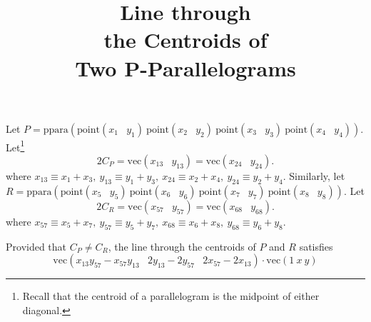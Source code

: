 \documentclass{article}
\title{Line through\\ the Centroids of\\ Two P-Parallelograms}
\begin{document}
\maketitle
\newcommand{\en}{\phantom{N}}
\noindent
Let
$P = \mathrm{ppara}(
\mathrm{point}(x_1\en y_1)\
\mathrm{point}(x_2\en y_2)\
\mathrm{point}(x_3\en y_3)\
\mathrm{point}(x_4\en y_4))$.
Let\footnote{Recall
that the centroid of a parallelogram is the midpoint of either diagonal.}
\[
2C_P =
\mathrm{vec}(x_{13}\en y_{13}) = 
\mathrm{vec}(x_{24}\en y_{24}).
\]
where
$x_{13} \equiv x_1 + x_3,\ y_{13} \equiv y_1 + y_3,\
x_{24} \equiv x_2 + x_4,\ y_{24} \equiv y_2 + y_4$.
Similarly, let
$R = \mathrm{ppara}(
\mathrm{point}(x_5\en y_5)\
\mathrm{point}(x_6\en y_6)\
\mathrm{point}(x_7\en y_7)\
\mathrm{point}(x_8\en y_8))$.
Let
\[
2C_R =
\mathrm{vec}(x_{57}\en y_{57}) =
\mathrm{vec}(x_{68}\en y_{68}).
\]
where
$x_{57} \equiv x_5 + x_7,\ y_{57} \equiv y_5 + y_7,\
x_{68} \equiv x_6 + x_8,\ y_{68} \equiv y_6 + y_8$.

Provided that $C_P \ne C_R$,
the line through the centroids of $P$ and $R$ satisfies
$$\mathrm{vec}(
x_{13}y_{57}-x_{57}y_{13}\en
2y_{13}-2y_{57}\en
2x_{57}-2x_{13})
\cdot
\mathrm{vec}(1\ x\ y)
$$
\end{document}

